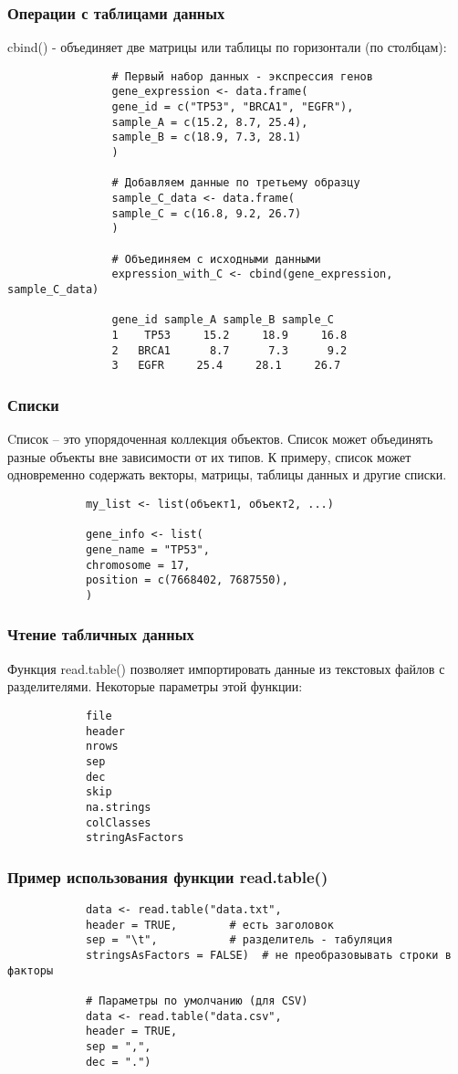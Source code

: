 \documentclass[10pt]{beamer}
\begin{document}
	
	\begin{frame}[fragile]
		\frametitle{Операции с таблицами данных}
		cbind() - объединяет две матрицы или таблицы по горизонтали (по столбцам):
		{\fontsize{7}{8}\selectfont	
			\begin{verbatim}
				# Первый набор данных - экспрессия генов
				gene_expression <- data.frame(
				gene_id = c("TP53", "BRCA1", "EGFR"),
				sample_A = c(15.2, 8.7, 25.4),
				sample_B = c(18.9, 7.3, 28.1)
				)
				
				# Добавляем данные по третьему образцу
				sample_C_data <- data.frame(
				sample_C = c(16.8, 9.2, 26.7)
				)
				
				# Объединяем с исходными данными
				expression_with_C <- cbind(gene_expression, sample_C_data)
				
				gene_id sample_A sample_B sample_C
				1    TP53     15.2     18.9     16.8
				2   BRCA1      8.7      7.3      9.2
				3   EGFR     25.4     28.1     26.7		
			\end{verbatim}
		}	
		
	\end{frame}
	
	\begin{frame}[fragile]
		\frametitle{Списки}
		Cписок – это упорядоченная коллекция объектов. Список может объединять разные объекты вне зависимости от их типов. К примеру, список может одновременно содержать векторы, матрицы, таблицы данных и другие списки.
		\begin{verbatim}
			my_list <- list(объект1, объект2, ...)
			
			gene_info <- list(
			gene_name = "TP53",
			chromosome = 17,
			position = c(7668402, 7687550),
			)
		\end{verbatim}
	\end{frame}
	
	
	\begin{frame}[fragile]
		\frametitle{Чтение табличных данных}
		Функция read.table() позволяет импортировать данные из текстовых файлов с разделителями. Некоторые параметры этой функции:
		\begin{verbatim}
			file
			header
			nrows
			sep
			dec
			skip
			na.strings
			colClasses
			stringAsFactors
		\end{verbatim}
	\end{frame}
	
	
	\begin{frame}[fragile]
		\frametitle{Пример использования функции read.table()}
		\begin{verbatim}
			data <- read.table("data.txt", 
			header = TRUE,        # есть заголовок
			sep = "\t",           # разделитель - табуляция
			stringsAsFactors = FALSE)  # не преобразовывать строки в факторы
			
			# Параметры по умолчанию (для CSV)
			data <- read.table("data.csv", 
			header = TRUE,
			sep = ",",
			dec = ".")
		\end{verbatim}
	\end{frame}
	
\end{document}
